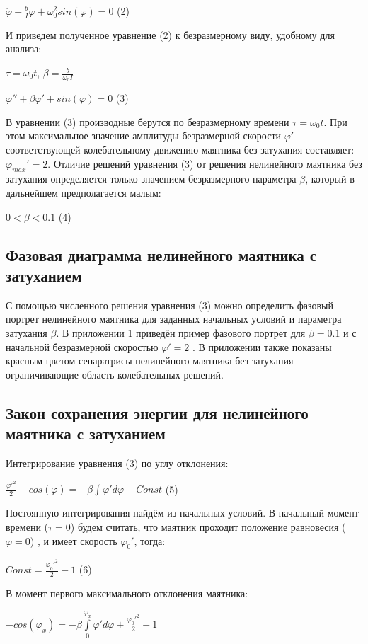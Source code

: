 \documentclass[a4paper]{article}
\begin{document}
\begin{center}$\ddot{\varphi}+\frac{b}{I}\dot{\varphi}+\omega_0^2 sin(\varphi) =0$ (2)\end{center}
И приведем полученное уравнение (2) к безразмерному виду, удобному для анализа:
\begin{center}$\tau=\omega_0t$, $\beta=\frac{b}{\omega_0I}$\end{center}

\begin{center}$\varphi''+\beta\varphi'+sin(\varphi)=0$ (3)\end{center}
В уравнении (3) производные берутся по безразмерному времени $\tau = \omega_0t$. При этом максимальное значение амплитуды безразмерной скорости $\varphi'$ соответствующей колебательному движению маятника без затухания составляет:  $\varphi_{max}'=2$. Отличие решений уравнения (3) от решения нелинейного маятника без затухания определяется только значением безразмерного параметра $\beta$, который в дальнейшем предполагается малым:
\begin{center}$0<\beta<0.1$ (4)\end{center}
\subsection{Фазовая диаграмма нелинейного маятника с затуханием}
С помощью численного решения уравнения (3) можно определить фазовый портрет нелинейного маятника для заданных начальных условий и
параметра затухания $\beta$. В приложении 1 приведён пример фазового портрет
для $\beta=0.1$ и с начальной безразмерной скоростью $\varphi'=2$ . В приложении
также показаны красным цветом сепаратрисы нелинейного маятника без
затухания ограничивающие область колебательных решений.

\subsection{Закон сохранения энергии для нелинейного маятника с затуханием}
Интегрирование уравнения (3) по углу отклонения:
\begin{center}$\frac{\varphi'^2}{2}-cos(\varphi)=-\beta\int\varphi'd\varphi + Const$ (5)\end{center}
Постоянную интегрирования найдём из начальных условий. В начальный момент времени ($\tau=0$) будем считать, что маятник проходит
положение равновесия ($\varphi=0$) , и имеет скорость $\varphi_0'$, тогда:
\begin{center}$Const = \frac{\varphi_0'^2}{2}-1$ (6)\end{center}
В момент первого максимального отклонения маятника:
\begin{center}$-cos(\varphi_x) = -\beta\int\limits_{0}^{\varphi_x}\varphi'd\varphi + \frac{\varphi_0'^2}{2} -1$\end{center}
\end{document}
